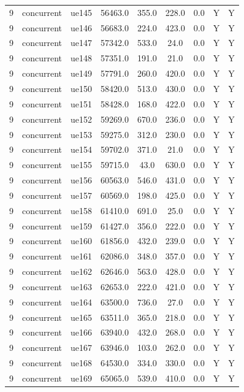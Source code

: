 \begin{table}[ht]
\begin{tabular}{|c|c|c|c|c|c|c|c|c|}
9 & concurrent & ue145 & 56463.0 & 355.0 & 228.0 & 0.0 & Y & Y \\
9 & concurrent & ue146 & 56683.0 & 224.0 & 423.0 & 0.0 & Y & Y \\
9 & concurrent & ue147 & 57342.0 & 533.0 & 24.0 & 0.0 & Y & Y \\
9 & concurrent & ue148 & 57351.0 & 191.0 & 21.0 & 0.0 & Y & Y \\
9 & concurrent & ue149 & 57791.0 & 260.0 & 420.0 & 0.0 & Y & Y \\
9 & concurrent & ue150 & 58420.0 & 513.0 & 430.0 & 0.0 & Y & Y \\
9 & concurrent & ue151 & 58428.0 & 168.0 & 422.0 & 0.0 & Y & Y \\
9 & concurrent & ue152 & 59269.0 & 670.0 & 236.0 & 0.0 & Y & Y \\
9 & concurrent & ue153 & 59275.0 & 312.0 & 230.0 & 0.0 & Y & Y \\
9 & concurrent & ue154 & 59702.0 & 371.0 & 21.0 & 0.0 & Y & Y \\
9 & concurrent & ue155 & 59715.0 & 43.0 & 630.0 & 0.0 & Y & Y \\
9 & concurrent & ue156 & 60563.0 & 546.0 & 431.0 & 0.0 & Y & Y \\
9 & concurrent & ue157 & 60569.0 & 198.0 & 425.0 & 0.0 & Y & Y \\
9 & concurrent & ue158 & 61410.0 & 691.0 & 25.0 & 0.0 & Y & Y \\
9 & concurrent & ue159 & 61427.0 & 356.0 & 222.0 & 0.0 & Y & Y \\
9 & concurrent & ue160 & 61856.0 & 432.0 & 239.0 & 0.0 & Y & Y \\
9 & concurrent & ue161 & 62086.0 & 348.0 & 357.0 & 0.0 & Y & Y \\
9 & concurrent & ue162 & 62646.0 & 563.0 & 428.0 & 0.0 & Y & Y \\
9 & concurrent & ue163 & 62653.0 & 222.0 & 421.0 & 0.0 & Y & Y \\
9 & concurrent & ue164 & 63500.0 & 736.0 & 27.0 & 0.0 & Y & Y \\
9 & concurrent & ue165 & 63511.0 & 365.0 & 218.0 & 0.0 & Y & Y \\
9 & concurrent & ue166 & 63940.0 & 432.0 & 268.0 & 0.0 & Y & Y \\
9 & concurrent & ue167 & 63946.0 & 103.0 & 262.0 & 0.0 & Y & Y \\
9 & concurrent & ue168 & 64530.0 & 334.0 & 330.0 & 0.0 & Y & Y \\
9 & concurrent & ue169 & 65065.0 & 539.0 & 410.0 & 0.0 & Y & Y \\

\end{tabular}
\end{table}
